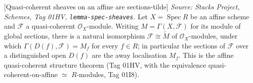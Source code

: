 \begin{lemma}

[Quasi-coherent sheaves on an affine are sections-tilde]
  \label{lem:qcoh_iso_tilde_sections}
  \textit{Source: Stacks Project, Schemes, Tag 01HV, \texttt{lemma-spec-sheaves}.}
  Let \(X = \operatorname{Spec} R\) be an affine scheme and \(\mathcal{F}\) a quasi-coherent
  \(\mathcal{O}_X\)-module. Writing \(M = \Gamma(X, \mathcal{F})\) for its module of global sections,
  there is a natural isomorphism \(\mathcal{F} \cong \widetilde{M}\) of \(\mathcal{O}_X\)-modules,
  under which \(\Gamma(D(f), \mathcal{F}) = M_f\) for every \(f \in R\); in particular the sections of
  \(\mathcal{F}\) over a distinguished open \(D(f)\) are the away localisation \(M_f\). This is the
  affine quasi-coherent structure theorem (Tag 01HV, with the equivalence quasi-coherent-on-affine
  \(\simeq\) \(R\)-modules, Tag 01I8).
\end{lemma}
